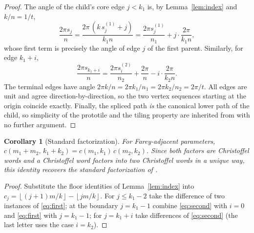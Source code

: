 \documentclass[11pt]{article}
\newtheorem{corollary}[theorem]{Corollary}
\theoremstyle{remark}
\theoremstyle{definition}
\newcommand{\floor}[1]{\left\lfloor #1 \right\rfloor}
\begin{document}
\begin{proof}
The angle of the child's core edge $j<k_1$ is, by Lemma~\ref{lem:index} and $k/n=1/t$,
\[
\frac{2\pi s_j}{n}
= \frac{2\pi\,(k\,s^{(1)}_j + j)}{k_1 n}
= \frac{2\pi s^{(1)}_j}{n_1} + j\cdot\frac{2\pi}{k_1 n},
\]
whose first term is precisely the angle of edge $j$ of the first parent. Similarly, for
edge $k_1+i$,
\[
\frac{2\pi s_{k_1+i}}{n}
= \frac{2\pi s^{(2)}_i}{n_2} + \frac{2\pi}{n} - i\cdot\frac{2\pi}{k_2 n}.
\]
The terminal edges have angle $2\pi k/n = 2\pi k_1/n_1 = 2\pi k_2/n_2 = 2\pi/t$.
All edges are unit and agree direction-by-direction, so the two vertex sequences starting
at the origin coincide exactly. Finally, the spliced path \emph{is} the canonical lower
path of the child, so simplicity of the prototile and the tiling property are inherited
from \cite{Imura2025} with no further argument.
\end{proof}

\begin{corollary}[Standard factorization]\label{cor:standard}
For Farey-adjacent parameters, $c(m_1+m_2,\,k_1+k_2) = c(m_1,k_1)\,c(m_2,k_2)$.
Since both factors are Christoffel words and a Christoffel word factors into two
Christoffel words in a unique way, this identity recovers the standard factorization of
\cite{BorelLaubie1993}.
\end{corollary}

\begin{proof}
Substitute the floor identities of Lemma~\ref{lem:index} into
$c_j=\floor{(j+1)m/k}-\floor{jm/k}$. For $j\le k_1-2$ take the difference of two
instances of \eqref{eq:first}; at the boundary $j=k_1-1$ combine \eqref{eq:second} with
$i=0$ and \eqref{eq:first} with $j=k_1-1$; for $j=k_1+i$ take differences of
\eqref{eq:second} (the last letter uses the case $i=k_2$).
\end{proof}
\end{document}
